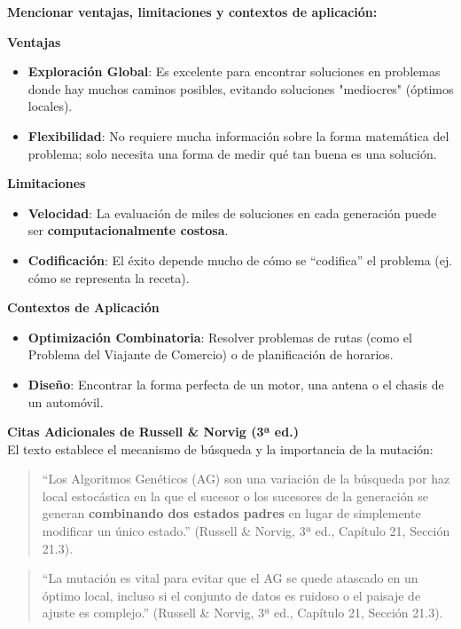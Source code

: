 \documentclass[letterpaper,12pt]{article}
\begin{document}
\begin{itemize}
    \vspace{0.2 cm}
    \textbf{Mencionar ventajas, limitaciones y contextos de aplicación:}

    \vspace{0.1 cm}
     \textbf{Ventajas}
    \begin{itemize}
     \item \textbf{Exploración Global}: Es excelente para encontrar soluciones en problemas donde hay muchos caminos posibles, evitando soluciones "mediocres" (óptimos locales).
     \item \textbf{Flexibilidad}: No requiere mucha información sobre la forma matemática del problema; solo necesita una forma de medir qué tan buena es una solución.
    \end{itemize}

    \vspace{0.1 cm}
  \textbf{Limitaciones}
    \begin{itemize}
     \item \textbf{Velocidad}: La evaluación de miles de soluciones en cada generación puede ser \textbf{computacionalmente costosa}.
     \item \textbf{Codificación}: El éxito depende mucho de cómo se ``codifica'' el problema (ej. cómo se representa la receta).
    \end{itemize}

    \vspace{0.1 cm}
    \textbf{Contextos de Aplicación}
    \begin{itemize}
     \item \textbf{Optimización Combinatoria}: Resolver problemas de rutas (como el Problema del Viajante de Comercio) o de planificación de horarios.
     \item \textbf{Diseño}: Encontrar la forma perfecta de un motor, una antena o el chasis de un automóvil.
    \end{itemize}

    \vspace{0.2 cm}
     \textbf {Citas Adicionales de Russell \& Norvig (3ª ed.)}
     \\
    El texto establece el mecanismo de búsqueda y la importancia de la mutación:
    \begin{quote}
     ``Los Algoritmos Genéticos (AG) son una variación de la búsqueda por haz local estocástica en la que el sucesor o los sucesores de la generación se generan \textbf{combinando dos estados padres} en lugar de simplemente modificar un único estado.''
     (Russell \& Norvig, 3ª ed., Capítulo 21, Sección 21.3).
    \end{quote}
    
    \begin{quote}
     ``La mutación es vital para evitar que el AG se quede atascado en un óptimo local, incluso si el conjunto de datos es ruidoso o el paisaje de ajuste es complejo.''
     (Russell \& Norvig, 3ª ed., Capítulo 21, Sección 21.3).
    \end{quote}
            

\end{itemize}
\end{document}
